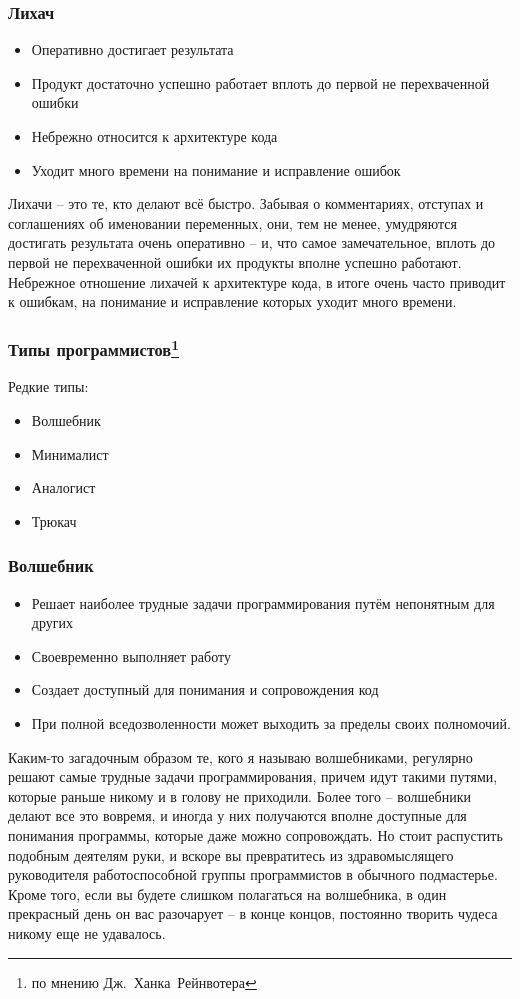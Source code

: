 \documentclass{../industrial-development}
\begin{document}
\begin{frame} \frametitle{Лихач}
	 \begin{itemize}
		\item Оперативно достигает результата 
		\item Продукт достаточно успешно работает вплоть до первой не перехваченной ошибки
                     \item Небрежно относится к архитектуре кода
		\item Уходит много времени на понимание и исправление ошибок
		 
		\end{itemize}
\end{frame}
\lecturenotes
Лихачи – это те, кто делают всё быстро. Забывая о комментариях, отступах и соглашениях об именовании переменных, они, тем не менее, умудряются достигать результата очень оперативно – и, что самое замечательное, вплоть до первой не перехваченной ошибки их продукты вполне успешно работают. 
	 Небрежное отношение лихачей к архитектуре кода, в итоге очень часто приводит к ошибкам, на понимание и исправление которых уходит много времени.

\begin{frame} \frametitle{Типы программистов\footnote[1]{по мнению Дж.~Ханка~Рейнвотера}}
	\begin{block}{Редкие типы:}
\begin{itemize}
\item Волшебник
\item Минималист
\item Аналогист
\item Трюкач
\end{itemize}
\end{block}
\end{frame}
\lecturenotes

\begin{frame} \frametitle{Волшебник}
	\begin{itemize}
		\item Решает наиболее трудные задачи программирования путём непонятным для других
		\item Своевременно выполняет работу
		\item Создает доступный для понимания и сопровождения код
		\item При полной вседозволенности может выходить за пределы своих полномочий.
\end{itemize}
\end{frame}
\lecturenotes
Каким-то загадочным образом те, кого я называю волшебниками, регулярно решают самые трудные задачи программирования, причем идут такими путями, которые раньше никому и в голову не приходили. Более того – волшебники делают все это вовремя, и иногда у них получаются вполне доступные для понимания программы, которые даже можно сопровождать. 
Но стоит распустить подобным деятелям руки, и вскоре вы превратитесь из здравомыслящего руководителя работоспособной группы программистов в обычного подмастерье. Кроме того, если вы будете слишком полагаться на волшебника, в один прекрасный день он вас разочарует – в конце концов, постоянно творить чудеса никому еще не удавалось. 
\end{document}
